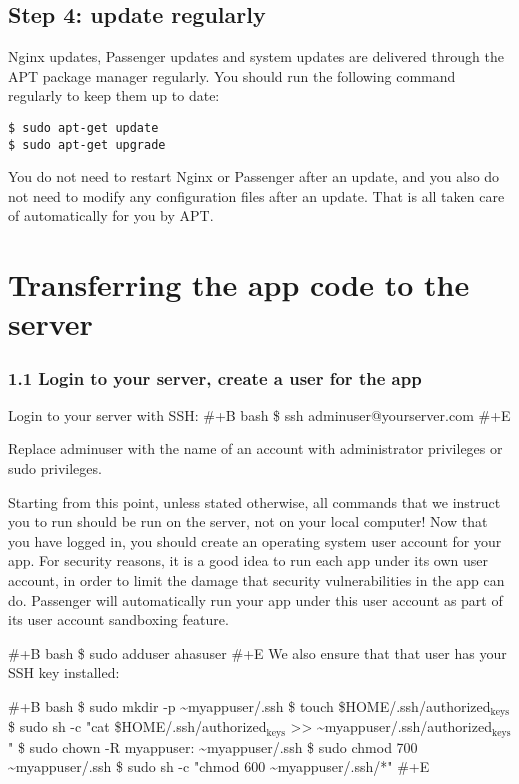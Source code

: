\documentclass[11pt]{article}
\begin{document}
\subsection{Step 4: update regularly}
\label{sec:orgc45398e}

Nginx updates, Passenger updates and system updates are delivered through the APT package manager regularly. You should run the following command regularly to keep them up to date:

\begin{verbatim}
$ sudo apt-get update
$ sudo apt-get upgrade
\end{verbatim}

You do not need to restart Nginx or Passenger after an update, and you also do not need to modify any configuration files after an update. That is all taken care of automatically for you by APT.
\section{Transferring the app code to the server}
\label{sec:orgadb9103}

\subsubsection{1.1 Login to your server, create a user for the app}
\label{sec:org2acda50}

Login to your server with SSH:
\#+B bash
\$ ssh adminuser@yourserver.com
\#+E

Replace adminuser with the name of an account with administrator privileges or sudo privileges.

Starting from this point, unless stated otherwise, all commands that we instruct you to run should be run on the server, not on your local computer!
Now that you have logged in, you should create an operating system user account for your app. For security reasons, it is a good idea to run each app under its own user account, in order to limit the damage that security vulnerabilities in the app can do. Passenger will automatically run your app under this user account as part of its user account sandboxing feature.

\#+B bash
\$ sudo adduser ahasuser
\#+E 
We also ensure that that user has your SSH key installed:

\#+B bash
\$ sudo mkdir -p \textasciitilde{}myappuser/.ssh
\$ touch \$HOME/.ssh/authorized\(_{\text{keys}}\)
\$ sudo sh -c "cat \$HOME/.ssh/authorized\(_{\text{keys}}\) >> \textasciitilde{}myappuser/.ssh/authorized\(_{\text{keys}}\)"
\$ sudo chown -R myappuser: \textasciitilde{}myappuser/.ssh
\$ sudo chmod 700 \textasciitilde{}myappuser/.ssh
\$ sudo sh -c "chmod 600 \textasciitilde{}myappuser/.ssh/*"
\#+E
\end{document}
